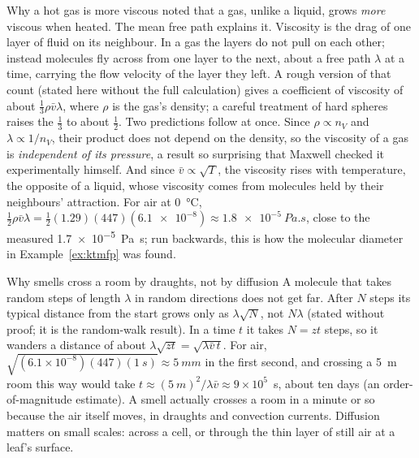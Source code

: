 \begin{remarkbox}{Why a hot gas is more viscous}
 noted that a gas, unlike a liquid, grows \emph{more} viscous when heated. The mean free
path explains it. Viscosity is the drag of one layer of fluid on its neighbour. In a gas the layers do not
pull on each other; instead molecules fly across from one layer to the next, about a free path $\lambda$
at a time, carrying the flow velocity of the layer they left. A rough version of that count (stated here
without the full calculation) gives a coefficient of viscosity of about
$\tfrac13\rho\bar v\lambda$, where $\rho$ is the gas's density; a careful treatment of hard spheres raises
the $\tfrac13$ to about $\tfrac12$. Two predictions follow at once. Since $\rho\propto n_V$ and
$\lambda\propto1/n_V$, their product does not depend on the density, so the viscosity of a gas is
\emph{independent of its pressure}, a result so surprising that Maxwell checked it experimentally himself.
And since $\bar v\propto\sqrt T$, the viscosity rises with temperature, the opposite of a liquid, whose
viscosity comes from molecules held by their neighbours' attraction. For air at \SI{0}{\celsius},
$\tfrac12\rho\bar v\lambda=\tfrac12(1.29)(447)(\num{6.1e-8})\approx\SI{1.8e-5}{Pa.s}$, close to the measured \SI{1.7e-5}{Pa.s}; run backwards, this is how the molecular diameter in Example~\ref{ex:ktmfp} was found.
\end{remarkbox}

\begin{remarkbox}{Why smells cross a room by draughts, not by diffusion}
A molecule that takes random steps of length $\lambda$ in random directions does not get far. After $N$
steps its typical distance from the start grows only as $\lambda\sqrt N$, not $N\lambda$ (stated without
proof; it is the random-walk result). In a time $t$ it takes $N=z t$ steps, so it wanders a distance of
about $\lambda\sqrt{zt}=\sqrt{\lambda\bar v\,t}$. For air,
$\sqrt{(6.1\times10^{-8})(447)(\SI{1}{s})}\approx\SI{5}{mm}$ in the first second, and crossing a
\SI{5}{m} room this way would take $t\approx(\SI{5}{m})^2/\lambda\bar v\approx 9\times10^5$~s, about ten
days (an order-of-magnitude estimate). A smell actually crosses a room in a minute or so because the air
itself moves, in draughts and convection currents. Diffusion matters on small scales: across a cell, or
through the thin layer of still air at a leaf's surface.
\end{remarkbox}

